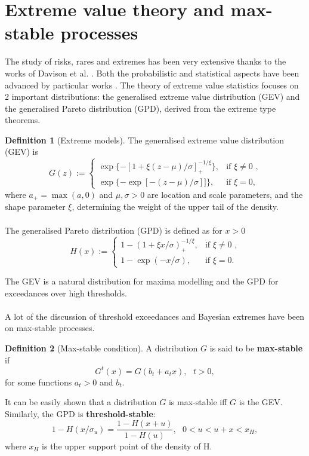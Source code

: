 \documentclass[12pt]{article}
\theoremstyle{definition}
\newtheorem{definition}{Definition}[section]
\theoremstyle{remark}
\theoremstyle{definition}
\theoremstyle{plain}
\begin{document}
\section{Extreme value theory and max-stable processes}
The study of risks, rares and extremes has been very extensive thanks to the works of Davison et al. \cite{Davison2015}. Both the probabilistic and statistical aspects have been advanced by particular works \cite{Haan1984} \cite{Davison2012} \cite{Davison2012a}. The theory of extreme value statistics focuses on 2 important distributions: the generalised extreme value distribution (GEV) and the generalised Pareto distribution (GPD), derived from the extreme type theorems.
\begin{definition}[Extreme models]
The generalised extreme value distribution (GEV) \cite{Davison2015} is
\[
G(z):= 
\begin{cases} \exp{\{-[1 + \xi(z-\mu)/\sigma]_{+}^{-1/\xi} \}}, & \mbox{if } \xi\neq 0 \mbox{ ,} \\ \exp{\{-\exp{[-(z-\mu)/\sigma]}] \}}, & \mbox{if } \xi=0,
\end{cases}
\]
where $a_{+} = \max{(a,0)}$ and $\mu, \sigma>0$ are location and scale parameters, and the shape parameter $\xi$, determining the weight of the upper tail of the density.
\\ \\
The generalised Pareto distribution (GPD) is defined as for $x>0$
\[
H(x):= 
\begin{cases} 1-(1 + \xi x/\sigma)_{+}^{-1/\xi}, & \mbox{if } \xi\neq 0 \mbox{ ,} \\ 1 - \exp{(-x/\sigma)}, & \mbox{if } \xi=0.
\end{cases}
\]

\end{definition}
The GEV is a natural distribution for maxima modelling and the GPD for exceedances over high thresholds. \\ \\
A lot of the discussion of threshold exceedances and Bayesian extremes have been on max-stable processes.
\begin{definition}[Max-stable condition]
A distribution $G$ is said to be \textbf{max-stable} if
\[
G^{t}(x) = G(b_{t} + a_{t}x), \mbox{ } t>0,
\]
for some functions $a_{t}>0$ and $b_{t}$.
\end{definition}
It can be easily shown that a distribution $G$ is max-stable iff $G$ is the GEV. Similarly, the GPD is \textbf{threshold-stable}:
\[
1 - H(x/\sigma_{u}) = \frac{1 - H(x+u)}{1-H(u)}, \mbox{  }0<u<u+x<x_{H},
\]
where $x_{H}$ is the upper support point of the density of H. 
\end{document}

